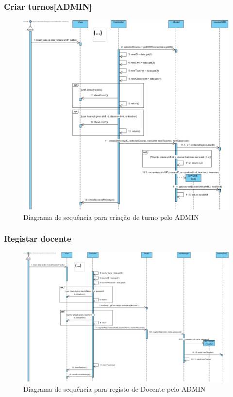 \documentclass[a4paper]{article}
\begin{document}
\subsubsection{Criar turnos[ADMIN]}

\begin{figure}[H]
\centering
\includegraphics[width=14cm]{SEQcriarTurnos}
\caption{Diagrama de sequência para criação de turno pelo ADMIN}
\label{}
\end{figure}

\subsubsection{Registar docente}

\begin{figure}[H]
\centering
\includegraphics[width=14cm]{SEQregistarDocente}
\caption{Diagrama de sequência para registo de Docente pelo ADMIN}
\label{}
\end{figure}
\end{document}
